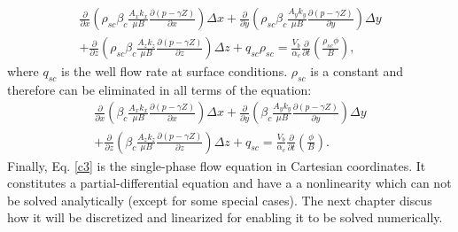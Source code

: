 	\begin{multline}
	\label{c1}
	\frac{\partial}{\partial x}\left( \rho_{sc}\beta_c \frac{A_x k_x}{\mu B}\frac{\partial (p - \gamma Z)}{\partial x}\right) \Delta x +
	\frac{\partial}{\partial y}\left( \rho_{sc}\beta_c \frac{A_y k_y}{\mu B}\frac{\partial (p - \gamma Z)}{\partial y}\right) \Delta y \\ +
	\frac{\partial}{\partial z}\left( \rho_{sc}\beta_c \frac{A_z k_z}{\mu B}\frac{\partial (p - \gamma Z)}{\partial z}\right) \Delta z +
	q_{sc}\rho_{sc}= \frac {V_b}{\alpha_c}\frac{\partial}{\partial t}\left( \frac{\rho_{sc}\phi}{B}\right) ,
	\end{multline}
where $q_{sc}$ is the well flow rate at surface conditions. $\rho_{sc}$ is a constant and therefore can be eliminated in all terms of the equation:
	\begin{multline}
	\label{c3}
	\frac{\partial}{\partial x}\left( \beta_c \frac{A_x k_x}{\mu B}\frac{\partial (p - \gamma Z)}{\partial x}\right) \Delta x +
	\frac{\partial}{\partial y}\left( \beta_c \frac{A_y k_y}{\mu B}\frac{\partial (p - \gamma Z)}{\partial y}\right) \Delta y \\ +
	\frac{\partial}{\partial z}\left( \beta_c \frac{A_z k_z}{\mu B}\frac{\partial (p - \gamma Z)}{\partial z}\right) \Delta z +
	q_{sc}= \frac {V_b}{\alpha_c}\frac{\partial}{\partial t}\left( \frac{\phi}{B}\right).
	\end{multline}
Finally, Eq. \ref{c3} is the single-phase flow equation in Cartesian coordinates. It constitutes a partial-differential equation and have a a nonlinearity which can not be solved analytically (except for some special cases). The next chapter discus how it will be discretized and linearized for enabling it to be solved numerically.

